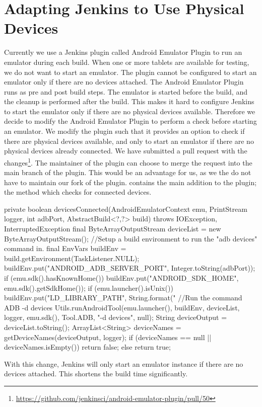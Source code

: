 \section{Adapting Jenkins to Use Physical Devices}
Currently we use a Jenkins plugin called Android Emulator Plugin \parencite{jenkins-emulator-plugin} to run an emulator during each build. When one or more tablets are available for testing, we do not want to start an emulator. The plugin cannot be configured to start an emulator only if there are no devices attached. The Android Emulator Plugin runs as pre and post build steps. The emulator is started before the build, and the cleanup is performed after the build. This makes it hard to configure Jenkins to start the emulator only if there are no physical devices available. Therefore we decide to modify the Android Emulator Plugin to perform a check before starting an emulator. We modify the plugin such that it provides an option to check if there are physical devices available, and only to start an emulator if there are no physical devices already connected. We have submitted a pull request with the changes\footnote{\url{https://github.com/jenkinsci/android-emulator-plugin/pull/50}}. The maintainer of the plugin can choose to merge the request into the main branch of the plugin. This would be an advantage for us, as we the do not have to maintain our fork of the plugin.  contains the main addition to the plugin; the method which checks for connected devices. 

\begin{javacode}[caption=The devicesConnected method which checks for connected devices.,label=lst:deviceCheck]
private boolean devicesConnected(AndroidEmulatorContext emu, PrintStream logger, int adbPort, AbstractBuild<?,?> build) 
throws IOException, InterruptedException {
    final ByteArrayOutputStream deviceList = new ByteArrayOutputStream();
    //Setup a build environment to run the "adb devices" command in.
    final EnvVars buildEnv = build.getEnvironment(TaskListener.NULL);
    buildEnv.put("ANDROID_ADB_SERVER_PORT", Integer.toString(adbPort));
    if (emu.sdk().hasKnownHome()) {
        buildEnv.put("ANDROID_SDK_HOME", emu.sdk().getSdkHome());
    }
    if (emu.launcher().isUnix()) {
        buildEnv.put("LD_LIBRARY_PATH", String.format("%
    }
    //Run the command ADB -d devices
    Utils.runAndroidTool(emu.launcher(), buildEnv, deviceList, logger, emu.sdk(), Tool.ADB, "-d devices", null);
    String deviceOutput = deviceList.toString();
    ArrayList<String> deviceNames = getDeviceNames(deviceOutput, logger);
    if (deviceNames == null || deviceNames.isEmpty()) {
        return false;
    }
    else {
        return true;
    }
}
\end{javacode}
With this change, Jenkins will only start an emulator instance if there are no devices attached. This shortens the build time significantly. 

